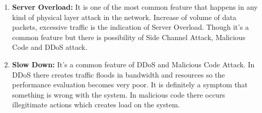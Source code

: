 \begin{enumerate}
 \item \textbf{Server Overload:} It is one of the most common feature that happens in any kind of physical layer attack in the network. Increase of volume of data packets, excessive traffic is the indication of Server Overload. Though it’s a common feature but there is possibility of Side Channel Attack, Malicious Code and DDoS attack. 
\item \textbf{Slow Down:} It’s a common feature of DDoS and Malicious Code Attack. In DDoS there creates traffic floods in bandwidth and resources so the performance evaluation becomes very poor. It is definitely a symptom that something is wrong with the system. In malicious code there occurs illegitimate actions which creates load on the system.



\end{enumerate}
